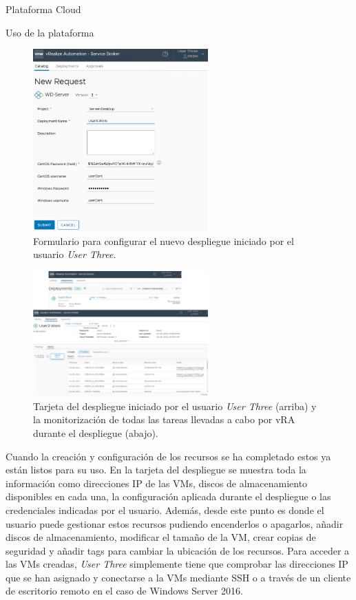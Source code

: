 \begin{subsection}{Plataforma Cloud}
\begin{subsubsection}{Uso de la plataforma}
\begin{figure}[h]
            \includegraphics[width=0.6\textwidth]{imaxes/pruebaconcepto/vrealize/deployment-user-3-Windows.png}
            \caption{Formulario para configurar el nuevo despliegue iniciado por el usuario \textit{User Three}.}
            \label{fig:login-user-3-form-deployment}
        \end{figure}
        \FloatBarrier
        \begin{figure}[h]
            \centering
            \includegraphics[width=0.6\textwidth]{imaxes/pruebaconcepto/vrealize/deployment-start-user-3-Windows.png}
            \caption{Tarjeta del despliegue iniciado por el usuario \textit{User Three} (arriba) y la monitorización de todas las tareas llevadas a cabo por vRA durante el despliegue (abajo).}
            \label{fig:deployment-process-user-3}
        \end{figure}
        \FloatBarrier
        Cuando la creación y configuración de los recursos se ha completado estos ya están listos para su uso. En la tarjeta del despliegue se muestra toda la información como direcciones IP de las VMs, discos de almacenamiento disponibles en cada una, la configuración aplicada durante el despliegue o las credenciales indicadas por el usuario. Además, desde este punto es donde el usuario puede gestionar estos recursos pudiendo encenderlos o apagarlos, añadir discos de almacenamiento, modificar el tamaño de la VM, crear copias de seguridad y añadir tags para cambiar la ubicación de los recursos. Para acceder a las VMs creadas, \textit{User Three} simplemente tiene que comprobar las direcciones IP que se han asignado y conectarse a la VMs mediante SSH o a través de un cliente de escritorio remoto en el caso de Windows Server 2016.

\end{subsubsection}
\end{subsection}
